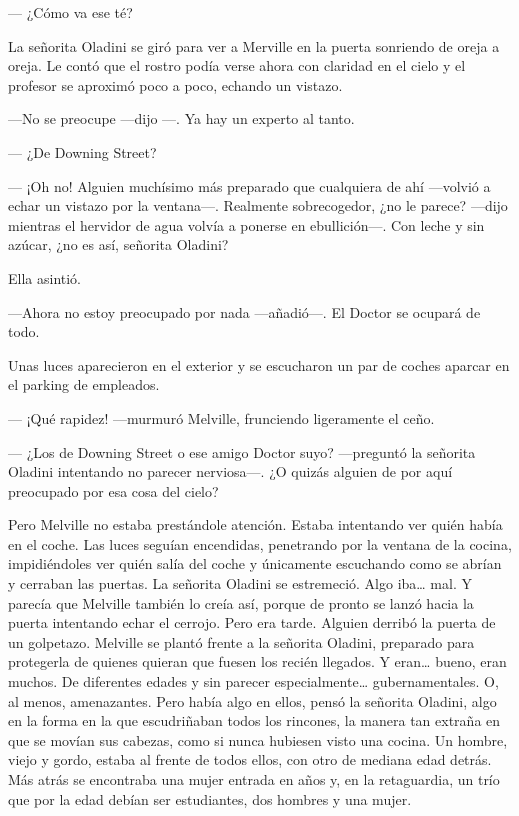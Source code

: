 --- ¿Cómo va ese té?

La señorita Oladini se giró para ver a Merville en la puerta sonriendo
de oreja a oreja. Le contó que el rostro podía verse ahora con claridad
en el cielo y el profesor se aproximó poco a poco, echando un vistazo.

---No se preocupe ---dijo ---. Ya hay un experto al tanto.

--- ¿De Downing Street?

--- ¡Oh no! Alguien muchísimo más preparado que cualquiera de ahí
---volvió a echar un vistazo por la ventana---.  Realmente sobrecogedor,
¿no le parece? ---dijo mientras el hervidor de agua volvía a ponerse en
ebullición---.  Con leche y sin azúcar, ¿no es así, señorita Oladini?

Ella asintió.

---Ahora no estoy preocupado por nada ---añadió---. El Doctor se ocupará
de todo.

Unas luces aparecieron en el exterior y se escucharon un par de coches
aparcar en el parking de empleados.

--- ¡Qué rapidez! ---murmuró Melville, frunciendo ligeramente el ceño.

--- ¿Los de Downing Street o ese amigo Doctor suyo? ---preguntó la
señorita Oladini intentando no parecer nerviosa---.  ¿O quizás alguien de
por aquí preocupado por esa cosa del cielo?

Pero Melville no estaba prestándole atención. Estaba intentando ver
quién había en el coche. Las luces seguían encendidas, penetrando por la
ventana de la cocina, impidiéndoles ver quién salía del coche y
únicamente escuchando como se abrían y cerraban las puertas. La señorita
Oladini se estremeció. Algo iba\ldots{} mal. Y parecía que Melville
también lo creía así, porque de pronto se lanzó hacia la puerta
intentando echar el cerrojo. Pero era tarde. Alguien derribó la puerta
de un golpetazo. Melville se plantó frente a la señorita Oladini,
preparado para protegerla de quienes quieran que fuesen los recién
llegados. Y eran\ldots{} bueno, eran muchos. De diferentes edades y sin
parecer especialmente\ldots{} gubernamentales. O, al menos, amenazantes.
Pero había algo en ellos, pensó la señorita Oladini, algo en la forma en
la que escudriñaban todos los rincones, la manera tan extraña en que se
movían sus cabezas, como si nunca hubiesen visto una cocina. Un hombre,
viejo y gordo, estaba al frente de todos ellos, con otro de mediana edad
detrás. Más atrás se encontraba una mujer entrada en años y, en la
retaguardia, un trío que por la edad debían ser estudiantes, dos hombres
y una mujer.

